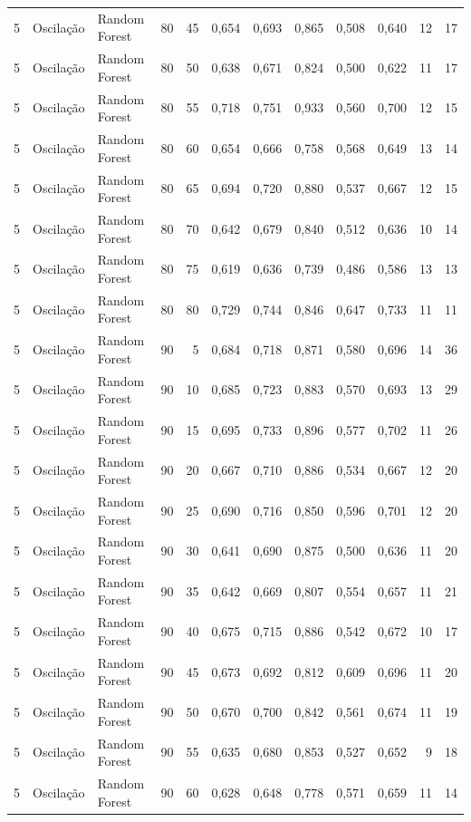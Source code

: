 \begin{longtable}{@{}rllrrrrrrrrr@{}}
5 & Oscilação & Random Forest & 80 & 45 & 0,654 & 0,693 & 0,865 & 0,508 & 0,640 & 12 & 17 \\
5 & Oscilação & Random Forest & 80 & 50 & 0,638 & 0,671 & 0,824 & 0,500 & 0,622 & 11 & 17 \\
5 & Oscilação & Random Forest & 80 & 55 & 0,718 & 0,751 & 0,933 & 0,560 & 0,700 & 12 & 15 \\
5 & Oscilação & Random Forest & 80 & 60 & 0,654 & 0,666 & 0,758 & 0,568 & 0,649 & 13 & 14 \\
5 & Oscilação & Random Forest & 80 & 65 & 0,694 & 0,720 & 0,880 & 0,537 & 0,667 & 12 & 15 \\
5 & Oscilação & Random Forest & 80 & 70 & 0,642 & 0,679 & 0,840 & 0,512 & 0,636 & 10 & 14 \\
5 & Oscilação & Random Forest & 80 & 75 & 0,619 & 0,636 & 0,739 & 0,486 & 0,586 & 13 & 13 \\
5 & Oscilação & Random Forest & 80 & 80 & 0,729 & 0,744 & 0,846 & 0,647 & 0,733 & 11 & 11 \\
5 & Oscilação & Random Forest & 90 & 5 & 0,684 & 0,718 & 0,871 & 0,580 & 0,696 & 14 & 36 \\
5 & Oscilação & Random Forest & 90 & 10 & 0,685 & 0,723 & 0,883 & 0,570 & 0,693 & 13 & 29 \\
5 & Oscilação & Random Forest & 90 & 15 & 0,695 & 0,733 & 0,896 & 0,577 & 0,702 & 11 & 26 \\
5 & Oscilação & Random Forest & 90 & 20 & 0,667 & 0,710 & 0,886 & 0,534 & 0,667 & 12 & 20 \\
5 & Oscilação & Random Forest & 90 & 25 & 0,690 & 0,716 & 0,850 & 0,596 & 0,701 & 12 & 20 \\
5 & Oscilação & Random Forest & 90 & 30 & 0,641 & 0,690 & 0,875 & 0,500 & 0,636 & 11 & 20 \\
5 & Oscilação & Random Forest & 90 & 35 & 0,642 & 0,669 & 0,807 & 0,554 & 0,657 & 11 & 21 \\
5 & Oscilação & Random Forest & 90 & 40 & 0,675 & 0,715 & 0,886 & 0,542 & 0,672 & 10 & 17 \\
5 & Oscilação & Random Forest & 90 & 45 & 0,673 & 0,692 & 0,812 & 0,609 & 0,696 & 11 & 20 \\
5 & Oscilação & Random Forest & 90 & 50 & 0,670 & 0,700 & 0,842 & 0,561 & 0,674 & 11 & 19 \\
5 & Oscilação & Random Forest & 90 & 55 & 0,635 & 0,680 & 0,853 & 0,527 & 0,652 & 9 & 18 \\
5 & Oscilação & Random Forest & 90 & 60 & 0,628 & 0,648 & 0,778 & 0,571 & 0,659 & 11 & 14 \\

\end{longtable}
